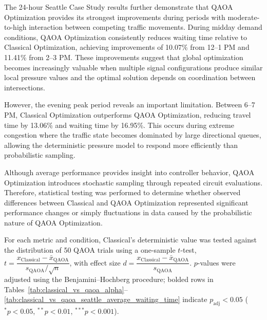 \documentclass[12pt]{article}
\begin{document}
The 24-hour Seattle Case Study results further demonstrate that QAOA Optimization provides its strongest improvements during periods with moderate-to-high interaction between competing traffic movements. During midday demand conditions, QAOA Optimization consistently reduces waiting time relative to Classical Optimization, achieving improvements of 10.07\% from 12--1 PM and 11.41\% from 2--3 PM. These improvements suggest that global optimization becomes increasingly valuable when multiple signal configurations produce similar local pressure values and the optimal solution depends on coordination between intersections.

However, the evening peak period reveals an important limitation. Between 6--7 PM, Classical Optimization outperforms QAOA Optimization, reducing travel time by 13.06\% and waiting time by 16.95\%. This occurs during extreme congestion where the traffic state becomes dominated by large directional queues, allowing the deterministic pressure model to respond more efficiently than probabilistic sampling.

Although average performance provides insight into controller behavior, QAOA Optimization introduces stochastic sampling through repeated circuit evaluations. Therefore, statistical testing was performed to determine whether observed differences between Classical and QAOA Optimization represented significant performance changes or simply fluctuations in data caused by the probabilistic nature of QAOA Optimization.

For each metric and condition, Classical's deterministic value was tested against the
distribution of 50 QAOA trials using a one-sample $t$-test,
$t = \dfrac{x_{\text{Classical}} - \bar{x}_{\text{QAOA}}}{s_{\text{QAOA}}/\sqrt{n}}$,
with effect size $d = \dfrac{x_{\text{Classical}} - \bar{x}_{\text{QAOA}}}{s_{\text{QAOA}}}$.
$p$-values were adjusted using the Benjamini--Hochberg procedure; bolded rows in
Tables~\ref{tab:classical_vs_qaoa_alpha}--\ref{tab:classical_vs_qaoa_seattle_average_waiting_time} indicate $p_{\text{adj}} < 0.05$
($^{*}p<0.05$, $^{**}p<0.01$, $^{***}p<0.001$).
\end{document}

